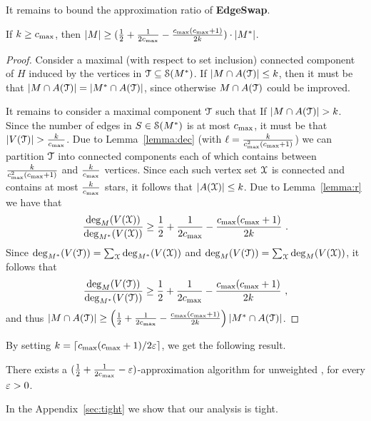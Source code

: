 \fi %

It remains to bound the approximation ratio of \textbf{EdgeSwap}.

\begin{lemma}
If $k \geq c_{\max}$, then $\left| M \right| \geq (\frac{1}{2} + \frac{1}{2c_{\max}}
- \frac{c_{\max}(c_{\max}+1)}{2k}) \cdot \left| M^* \right|$.
\end{lemma}
\begin{proof}
Consider a maximal (with respect to set inclusion) connected component
of $H$ induced by the vertices in $\mathcal{T} \subseteq \mathcal{S}(M^*)$.
%
If $\left| M \cap A(\mathcal{T}) \right| \leq k$, then it must be that $\left| M \cap
A(\mathcal{T}) \right| = \left| M^* \cap A(\mathcal{T}) \right|$, since otherwise $M \cap
A(\mathcal{T})$ could be improved.

It remains to consider a maximal component $\mathcal{T}$ such that If
$\left| M \cap A(\mathcal{T}) \right| > k$.  Since the number of edges in
$S \in \mathcal{S}(M^*)$ is at most $c_{\max}$, it must be that $\left| V(\mathcal{T}) \right|
> \frac{k}{c_{\max}}$.
%
Due to Lemma~\ref{lemma:dec} (with $\ell
= \frac{k}{c_{\max}^2(c_{\max}+1)}$) we can partition $\mathcal{T}$ into connected
components each of which contains between $\frac{k}{c_{\max}^2(c_{\max}+1)}$
and $\frac{k}{c_{\max}}$ vertices.
%
Since each such vertex set $\mathcal{X}$ is connected and contains at most
$\frac{k}{c_{\max}}$ stars, it follows that $\left| A(\mathcal{X}) \right| \leq k$.
%
Due to Lemma~\ref{lemma:r} we have that
\[
\frac{\deg_M(V(\mathcal{X}))}{\deg_{M^*}(V(\mathcal{X}))} 
\geq \frac{1}{2} + \frac{1}{2c_{\max}} - \frac{c_{\max}(c_{\max}+1)}{2k}
~.
\]
Since $\deg_{M^*}(V(\mathcal{T})) = \sum_{\mathcal{X}} \deg_{M^*}(V(\mathcal{X}))$ and
$\deg_M(V(\mathcal{T})) = \sum_{\mathcal{X}} \deg_M(V(\mathcal{X}))$, it follows that
\[
\frac{\deg_M(V(\mathcal{T}))}{\deg_{M^*}(V(\mathcal{T}))}
\geq \frac{1}{2} + \frac{1}{2c_{\max}} - \frac{c_{\max}(c_{\max}+1)}{2k}
~,
\]
and thus
\(
\left| M \cap A(\mathcal{T}) \right|
\geq \left(  \frac{1}{2} + \frac{1}{2c_{\max}} -
             \frac{c_{\max}(c_{\max}+1)}{2k} \right) \left| M^* \cap A(\mathcal{T}) \right|
\).
\end{proof}

By setting $k = \left\lceil c_{\max}(c_{\max}+1)/2\varepsilon \right\rceil$, we get the following
result.

\begin{corollary}
\label{cor:local}
There exists a $(\frac{1}{2} + \frac{1}{2c_{\max}} - \varepsilon)$-approximation algorithm
for unweighted \carpool, for every $\varepsilon>0$.
\end{corollary}

In the Appendix~\ref{sec:tight} we show that our analysis is tight.
